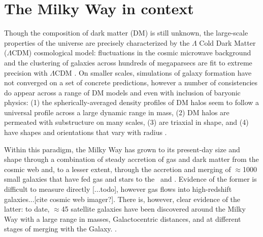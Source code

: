 

\section{The Milky Way in context}\label{sec:milkyway-context}

Though the composition of dark matter (DM) is still unknown, the large-scale properties of the universe are precisely characterized by the $\Lambda$ Cold Dark Matter ($\Lambda$CDM) cosmological model: fluctuations in the cosmic microwave background and the clustering of galaxies across hundreds of megaparsecs are fit to extreme precision with $\Lambda$CDM \citep{planck15, sanchez12}. On smaller scales, simulations of galaxy formation have not converged on a set of concrete predictions, however a number of consistencies do appear across a range of DM models and even with inclusion of baryonic physics: (1) the spherically-averaged density profiles of DM halos seem to follow a universal profile across a large dynamic range in mass, (2) DM halos are permeated with substructure on many scales, (3) are triaxial in shape, and (4) have shapes and orientations that vary with radius \citep{dubinski91, navarro96, jing02, kuhlen07, veraciro11}. 

Within this paradigm, the Milky Way has grown to its present-day size and shape through a combination of steady accretion of gas and dark matter from the cosmic web and, to a lesser extent, through the accretion and merging of $\approx$1000 small galaxies that have fed gas and stars to the \mwdisk\ and \mwhalo. Evidence of the former is difficult to measure directly [...todo], however gas flows into high-redshift galaxies...[cite cosmic web imager?]. There is, however, clear evidence of the latter: to date, $\approx$45 satellite galaxies have been discovered around the Milky Way with a large range in masses, Galactocentric distances, and at different stages of merging with the Galaxy. .

